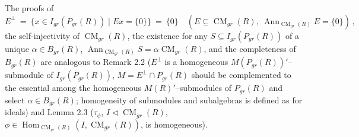 \documentclass[a4paper,11pt]{article}
\DeclareMathOperator{\Hom}{Hom}
\DeclareMathOperator{\CM}{CM}
\DeclareMathOperator{\Ann}{Ann}
\begin{document}
The proofs of 
\[
E^{\perp}\ =\ \{x\in I_{gr}(P_{gr}(R))\mid E x=\{0\}\}\ =\ \{0\}\quad 
(E\subseteq \CM_{gr}(R),\ \Ann_{\CM_{gr}(R)} E=\{0\})\,,
\]
the self-injectivity of $\CM_{gr}(R)$, the existence for any 
${S\subseteq I_{gr}(P_{gr}(R))}$ of a unique 
${\alpha\in B_{gr}(R)}$, ${\Ann_{\CM_{gr}(R)} S=\alpha \CM_{gr}(R)}$, 
and the completeness of 
$B_{gr}(R)$ are analogous to Remark 2.2 ($E^{\perp}$ is a homogeneous 
$M(P_{gr}(R))'$--submodule of $I_{gr}(P_{gr}(R))$, 
${M=E^{\perp}\cap P_{gr}(R)}$ should be complemented to the essential 
among the homogeneous $M(R)'$--submodules of $P_{gr}(R)$ and select 
${\alpha\in B_{gr}(R)}$; homogeneity of submodules and subalgebras is 
defined as for ideals) and Lemma 2.3 ($\tau_{\phi}$, ${I\lhd \CM_{gr}(R)}$, 
${\phi\in \Hom_{\CM_{gr}(R)}(I, \CM_{gr}(R))}$, is homogeneous).
\end{document}
